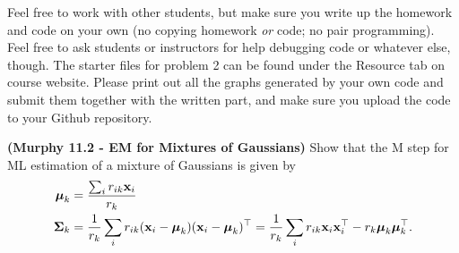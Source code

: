 \documentclass[12pt,letterpaper,fleqn]{hmcpset}
\begin{document}
Feel free to work with other students, but make sure you write up the homework
and code on your own (no copying homework \textit{or} code; no pair programming).
Feel free to ask students or instructors for help debugging code or whatever else,
though.
\newline
\newline
The starter files for problem 2 can be found under the Resource tab on course website. Please print out all the graphs generated by your own code and submit them together with the written part, and make sure you upload the code to your Github repository.\\

\begin{problem}[1]
\textbf{(Murphy 11.2 - EM for Mixtures of Gaussians)} Show that the M step for ML
estimation of a mixture of Gaussians is given by
\begin{align*}
    \hbox{\boldmath$\mu$}_k &= \frac{\sum_i r_{ik}{\bf x}_i}{r_k}\\
    \hbox{\boldmath$\Sigma$}_k &= \frac{1}{r_k}\sum_i r_{ik}({\bf x}_i - \hbox{\boldmath$\mu$}_k)({\bf x}_i - \hbox{\boldmath$\mu$}_k)^\top = \frac{1}{r_k}\sum_i r_{ik}{\bf x}_i{\bf x}_i^\top - r_k\hbox{\boldmath$\mu$}_k\hbox{\boldmath$\mu$}_k^\top.
\end{align*}
\end{problem}
\end{document}
